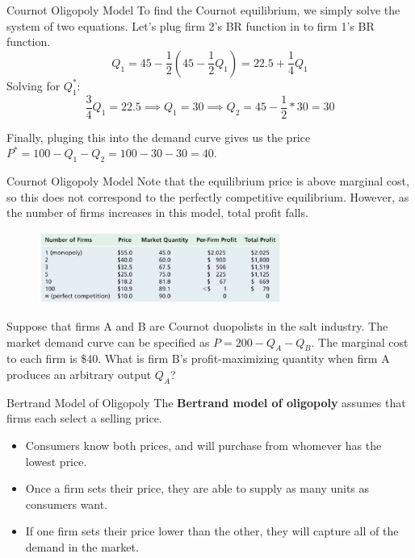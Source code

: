 \documentclass[11pt,t]{beamer}
\begin{document}
\begin{frame}{Cournot Oligopoly Model}
  To find the Cournot equilibrium, we simply solve the system of two equations. Let's plug firm 2's BR function in to firm 1's BR function.
  $$
    Q_1 = 45 - \frac{1}{2} (45 - \frac{1}{2} Q_1) = 22.5 + \frac{1}{4} Q_1
  $$
  Solving for $Q_1^*$:
  $$
    \frac{3}{4}Q_1 = 22.5 \implies Q_1 = 30 \implies Q_2 = 45 - \frac{1}{2} * 30 = 30
  $$
  
  Finally, pluging this into the demand curve gives us the price $P^* = 100 - Q_1 - Q_2 = 100 - 30 - 30 = 40$.
\end{frame}

\begin{frame}{Cournot Oligopoly Model}
  Note that the equilibrium price is above marginal cost, so this does not correspond to the perfectly competitive equilibrium. However, as the number of firms increases in this model, total profit falls.

  \begin{figure}
    \includegraphics[width=300px]{figures/table13_4.jpg}
  \end{figure}
\end{frame}

\begin{frame}{}
  Suppose that firms A and B are Cournot duopolists in the salt industry.  The market demand curve can be specified as $P = 200 - Q_A - Q_B$.  The marginal cost to each firm is \$40. What is firm B's profit-maximizing quantity when firm A produces an arbitrary output $Q_A$?
\end{frame}

\begin{frame}{Bertrand Model of Oligopoly}
  The \textbf{Bertrand model of oligopoly} assumes that firms each select a selling price.

  \begin{itemize}
    \item Consumers know both prices, and will purchase from whomever has the lowest price.
    \item Once a firm sets their price, they are able to supply as many units as consumers want.
    \item If one firm sets their price lower than the other, they will capture all of the demand in the market.
  \end{itemize}
\end{frame}
\end{document}
